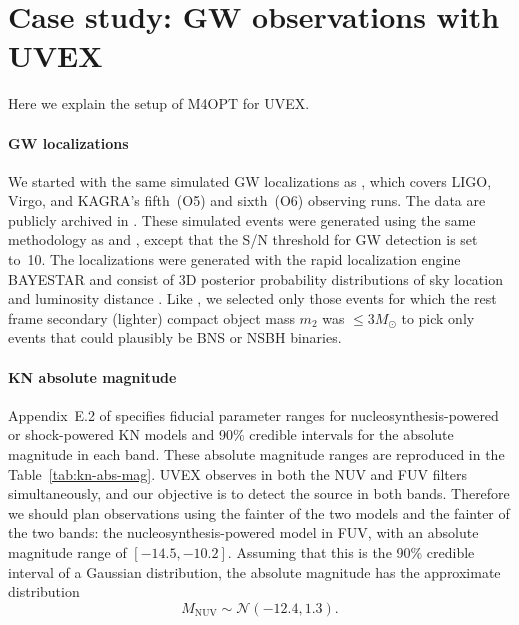 \documentclass[twocolumn,times]{aastex631}
\begin{document}
\section{Case study: GW observations with UVEX}

Here we explain the setup of \ac{M4OPT} for \ac{UVEX}.

\paragraph{\Ac{GW} localizations}
We started with the same simulated \ac{GW} localizations as \citet{2025arXiv250114109C}, which covers LIGO, Virgo, and KAGRA's fifth~(O5) and sixth~(O6) observing runs. The data are publicly archived in \cite{r_weizmann_2025_14585837}. These simulated events were generated using the same methodology as \citet{2022ApJ...924...54P} and \citet{2023ApJ...958..158K}, except that the \ac{S/N} threshold for \ac{GW} detection is set to~10. The localizations were generated with the rapid localization engine BAYESTAR \citep{2016PhRvD..93b4013S} and consist of 3D posterior probability distributions of sky location and luminosity distance \citep{2016ApJ...829L..15S,2016ApJS..226...10S}. Like \citet{2025arXiv250114109C}, we selected only those events for which the rest frame secondary (lighter) compact object mass $m_2$ was $\leq 3 M_\odot$ to pick only events that could plausibly be \ac{BNS} or \ac{NSBH} binaries.

\paragraph{\Ac{KN} absolute magnitude}
Appendix~E.2 of \citet{2021arXiv211115608K} specifies fiducial parameter ranges for nucleosynthesis-powered or shock-powered \ac{KN} models and 90\% credible intervals for the absolute magnitude in each band. These absolute magnitude ranges are reproduced in the Table~\ref{tab:kn-abs-mag}. \ac{UVEX} observes in both the \ac{NUV} and \ac{FUV} filters simultaneously, and our objective is to detect the source in both bands. Therefore we should plan observations using the fainter of the two models and the fainter of the two bands: the nucleosynthesis-powered model in FUV, with an absolute magnitude range of $[-14.5, -10.2]$. Assuming that this is the 90\% credible interval of a Gaussian distribution, the absolute magnitude has the approximate distribution
%
\begin{equation}
    \label{eq:absmag-distn}
    M_\mathrm{NUV} \sim \mathcal{N}(-12.4, 1.3).
\end{equation}
\end{document}
